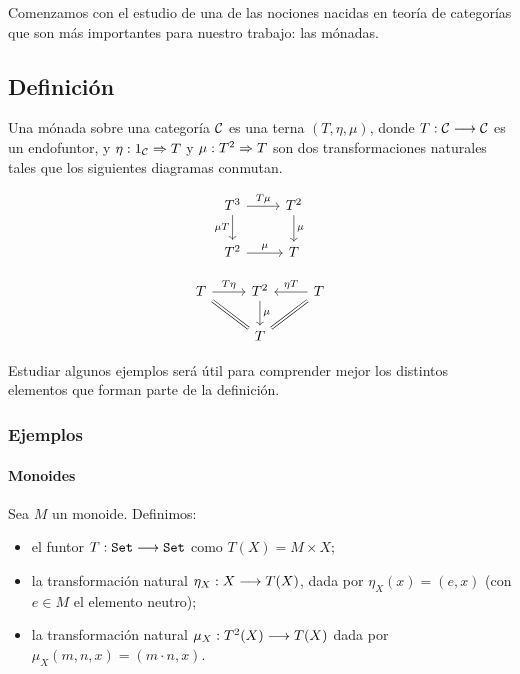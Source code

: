 Comenzamos con el estudio de una de las nociones nacidas
en teoría de categorías que son
más importantes para nuestro trabajo: las mónadas.

\subsection{Definición}
\begin{definition}
  Una mónada sobre una categoría $\mathcal{C}$
  es una terna $(T, \eta, \mu)$, donde $T : \mathcal{C}\longrightarrow \mathcal{C}$ es un
  endofuntor, y $\eta : 1_{\mathcal{C}}\Rightarrow T$ y $\mu: T^2\Rightarrow T$ son dos
  transformaciones naturales tales que los siguientes diagramas
  conmutan.
  \begin{center}
    \begin{equation}\label{diagrama:mu}
    \begin{tikzcd}
      T^3 \arrow{d}[swap]{\mu T} \arrow{r}{T\mu} & T^2 \arrow{d}{\mu} \\
      T^2 \arrow{r}{\mu} & T
    \end{tikzcd}
    \end{equation}

    \begin{equation}\label{diagrama:eta}
      \begin{tikzcd}
        T \ar[equal]{dr} \arrow{r}{T\eta} & T^2 \arrow{d}{\mu} & T \arrow{l}[swap]{\eta T} \ar[equal]{ld} \\
        & T &
      \end{tikzcd}
    \end{equation}
  \end{center}
\end{definition}
Estudiar algunos ejemplos será útil para comprender mejor
los distintos elementos que forman parte
de la definición.

\subsubsection{Ejemplos}
\paragraph{Monoides}
Sea $M$ un monoide. Definimos:
\begin{itemize}
\item el funtor $T : \texttt{Set}\longrightarrow \texttt{Set}$
  como $T(X) = M\times X$;
\item la transformación natural $\eta_X : X\longrightarrow T(X)$, dada
por $\eta_X(x) = (e, x)$ (con $e \in M$ el elemento neutro);
\item la transformación natural $\mu_X : T^2(X)\longrightarrow T(X)$ dada por
$\mu_X(m, n, x) = (m\cdot n, x)$.
\end{itemize}

